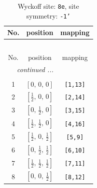 \documentclass[fleqn,8pt]{jsarticle}
\begin{document}
\renewcommand{\arraystretch}{1.2}
\begin{longtable}{ccc}
\caption{Wyckoff site: {\tt 8e}, site symmetry: {\tt -1'}}
 \\
 \hline \hline
No. & position & mapping \\ \hline \endfirsthead

\multicolumn{2}{l}{\tablename\ \thetable{}} \\
 \hline \hline
No. & position & mapping \\ \hline \endhead

 \hline \hline
\multicolumn{2}{r}{\footnotesize\it continued ...} \\ \endfoot

 \hline \hline
\multicolumn{2}{r}{} \\ \endlastfoot

1 & $\left[ 0,\, 0,\, 0 \right]$ & {\tt [1,13]} \\ \hline
2 & $\left[ \frac{1}{2},\, 0,\, 0 \right]$ & {\tt [2,14]} \\ \hline
3 & $\left[ 0,\, \frac{1}{2},\, 0 \right]$ & {\tt [3,15]} \\ \hline
4 & $\left[ \frac{1}{2},\, \frac{1}{2},\, 0 \right]$ & {\tt [4,16]} \\ \hline
5 & $\left[ \frac{1}{2},\, 0,\, \frac{1}{2} \right]$ & {\tt [5,9]} \\ \hline
6 & $\left[ 0,\, \frac{1}{2},\, \frac{1}{2} \right]$ & {\tt [6,10]} \\ \hline
7 & $\left[ \frac{1}{2},\, \frac{1}{2},\, \frac{1}{2} \right]$ & {\tt [7,11]} \\ \hline
8 & $\left[ 0,\, 0,\, \frac{1}{2} \right]$ & {\tt [8,12]} \\
\end{longtable}
\renewcommand{\arraystretch}{1.2}
\end{document}

